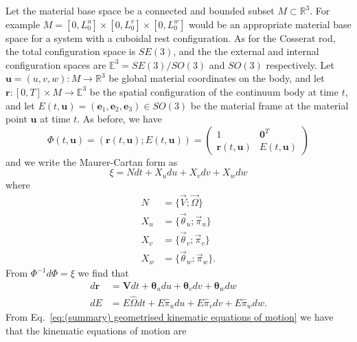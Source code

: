 Let the material base space be a connected and bounded subset $M \subset \mathbb{R}^3$. For example $M = [0, L^u_0] \times [0, L^v_0] \times [0, L^w_0]$ would be an appropriate material base space for a system with a cuboidal rest configuration. As for the Cosserat rod, the total configuration space is $SE(3)$, and the the external and internal configuration spaces are $\mathbb{E}^3 = SE(3) / SO(3)$ and $SO(3)$ respectively. Let $\mathbf{u} = (u, v, w) : M \to \mathbb{R}^3$ be global material coordinates on the body, and let $\mathbf{r} : [0, T] \times M \to \mathbb{E}^3$ be the  spatial configuration of the continuum body at time $t$, and let $E(t,\mathbf{u}) = (\mathbf{e}_1, \mathbf{e}_2, \mathbf{e}_3) \in SO(3)$ be the material frame at the material point $\mathbf{u}$ at time $t$. As before, we have
\begin{equation}
\Phi(t,\mathbf{u}) = (\mathbf{r}(t, \mathbf{u}) ; E(t, \mathbf{u})) =  \begin{pmatrix}
1 & \mathbf{0}^T \\
\mathbf{r}(t,\mathbf{u}) & E(t,\mathbf{u})
\end{pmatrix}
\end{equation}
and we write the Maurer-Cartan form as
\begin{equation}
\xi = N dt + X_u du + X_v dv + X_w dw
\end{equation}
where
\begin{subequations} \label{eq:N X_alpha defs 3D}
\begin{align}
N & = \{ \vec{V}; \vec{\Omega} \} \\
X_u & = \{ \vec{\theta}_u ; \vec{\pi}_u \} \\
X_v & = \{ \vec{\theta}_v ; \vec{\pi}_v \} \\
X_w & = \{ \vec{\theta}_w ; \vec{\pi}_w \}.
\end{align}
\end{subequations}
From $\Phi^{-1} d \Phi = \xi$ we find that
\begin{subequations} \label{eq:body dr and dE}
\begin{align}
d \mathbf{r} & = \mathbf{V} dt + \boldsymbol{\theta}_u du + \boldsymbol{\theta}_v dv + \boldsymbol{\theta}_w dw \\
d E & = E \hat{\Omega} dt + E \hat{\pi}_u du + E \hat{\pi}_v dv + E \hat{\pi}_w dw.
\end{align}
\end{subequations}
From Eq.~\ref{eq:(summary) geometrised kinematic equations of motion} we have that the kinematic equations of motion are

